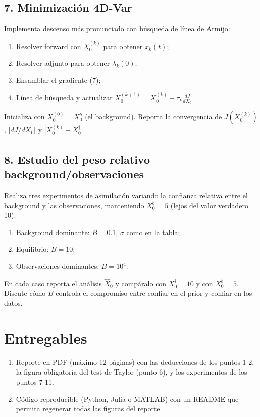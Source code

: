 \documentclass[12pt,spanish,mexico]{article}
\numberwithin{equation}{section}
\theoremstyle{definition}
\theoremstyle{remark}
\begin{document}
\subsection{7. Minimización 4D-Var}
Implementa descenso más pronunciado con búsqueda de línea de Armijo:
\begin{enumerate}[label=(\alph*)]
\item Resolver forward con \(X_0^{(k)}\) para obtener \(x_k(t)\);
\item Resolver adjunto para obtener \(\lambda_k(0)\);
\item Ensamblar el gradiente (7);
\item Línea de búsqueda y actualizar \(X_0^{(k+1)} = X_0^{(k)} - \tau_k \frac{dJ}{dX_0}\).
\end{enumerate}
Inicializa con \(X_0^{(0)} = X_0^b\) (el background). Reporta la convergencia de \(J(X_0^{(k)})\), \(|dJ/dX_0|\) y \(|X_0^{(k)} - X_0^\dagger|\).

\subsection{8. Estudio del peso relativo background/observaciones}
Realiza tres experimentos de asimilación variando la confianza relativa entre el background y las observaciones, manteniendo \(X_0^b = 5\) (lejos del valor verdadero 10):
\begin{enumerate}[label=(\alph*)]
\item Background dominante: \(B = 0.1\), \(\sigma\) como en la tabla;
\item Equilibrio: \(B = 10\);
\item Observaciones dominantes: \(B = 10^{4}\).
\end{enumerate}
En cada caso reporta el análisis \(\hat{X}_0\) y compáralo con \(X_0^\dagger = 10\) y con \(X_0^b = 5\). Discute cómo \(B\) controla el compromiso entre confiar en el prior y confiar en los datos.

\section{Entregables}
\begin{enumerate}[label=(\alph*)]
\item Reporte en PDF (máximo 12 páginas) con las deducciones de los puntos 1-2, la figura obligatoria del test de Taylor (punto 6), y los experimentos de los puntos 7-11.
\item Código reproducible (Python, Julia o MATLAB) con un README que permita regenerar todas las figuras del reporte.
\end{enumerate}
\end{document}
